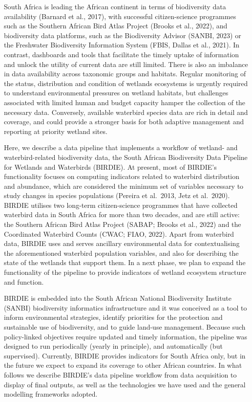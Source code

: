 \documentclass[utf8]{frontiersSCNS}
\begin{document}
South Africa is leading the African continent in terms of biodiversity
data availability (Barnard et al., 2017), with successful
citizen-science programmes such as the Southern African Bird Atlas
Project (Brooks et al., 2022), and biodiversity data platforms, such as
the Biodiversity Advisor (SANBI, 2023) or the Freshwater Biodiversity
Information System (FBIS, Dallas et al., 2021). In contrast, dashboards
and tools that facilitate the timely uptake of information and unlock
the utility of current data are still limited. There is also an
imbalance in data availability across taxonomic groups and habitats.
Regular monitoring of the status, distribution and condition of wetlands
ecosystems is urgently required to understand environmental pressures on
wetland habitats, but challenges associated with limited human and
budget capacity hamper the collection of the necessary data. Conversely,
available waterbird species data are rich in detail and coverage, and
could provide a stronger basis for both adaptive management and
reporting at priority wetland sites.

Here, we describe a data pipeline that implements a workflow of wetland-
and waterbird-related biodiversity data, the South African Biodiversity
Data Pipeline for Wetlands and Waterbirds (BIRDIE). At present, most of
BIRDIE's functionality focuses on computing indicators related to
waterbird distribution and abundance, which are considered the minimum
set of variables necessary to study changes in species populations
(Pereira et al.~2013, Jetz et al.~2020). BIRDIE utilises two long-term
citizen-science programmes that have collected waterbird data in South
Africa for more than two decades, and are still active: the Southern
African Bird Atlas Project (SABAP; Brooks et al., 2022) and the
Coordinated Waterbird Counts (CWAC; FIAO, 2022). Apart from waterbird
data, BIRDIE uses and serves ancillary environmental data for
contextualising the aforementioned waterbird population variables, and
also for describing the state of the wetlands that support them. In a
next phase, we plan to expand the functionality of the pipeline to
provide indicators of wetland ecosystem structure and function.

BIRDIE is embedded into the South African National Biodiversity
Institute (SANBI) biodiversity informatics infrastructure and it was
conceived as a tool to inform environmental strategies, identify
priorities for the protection and sustainable use of biodiversity, and
to guide land-use management. Because such policy-linked objectives
require updated and timely information, the pipeline was designed to run
periodically (yearly in principle), and automatically (but supervised).
Currently, BIRDIE provides indicators for South Africa only, but in the
future we expect to expand its coverage to other African countries. In
what follows we describe BIRDIE's data pipeline workflow from data
acquisition to display of final outputs, as well as the technologies we
have used and the general modelling frameworks adopted.
\end{document}
